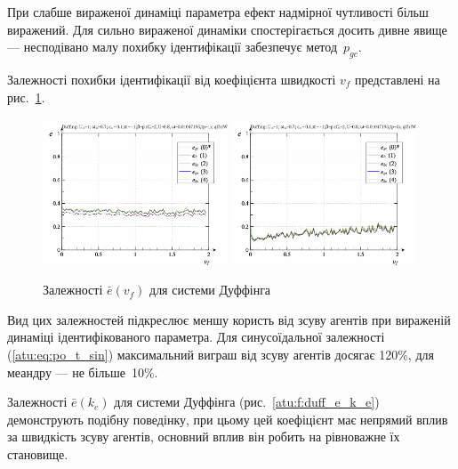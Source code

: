 При слабше вираженої динаміці параметра ефект надмірної
чутливості більш виражений. Для сильно вираженої динаміки
спостерігається досить дивне явище --- несподівано малу похибку
ідентифікації забезпечує метод~$p_{gc}$.

Залежності похибки ідентифікації від коефіцієнта швидкості $ v_f $ представлені на рис.~\ref{atu:f:duff_e_v_f}.

\begin{figure}[ht!]
\begin{center}
  \includegraphics[width=0.49\textwidth]{p/cha/duff/duff_id-p_v_f_sign.png}
  \hfill
  \includegraphics[width=0.49\textwidth]{p/cha/duff/duff_id-p_v_f_sin.png}
\end{center}
\caption{Залежності $ \bar{e} (v_f) $ для системи Дуффінга}
\label{atu:f:duff_e_v_f}
\end{figure}

Вид цих залежностей підкреслює меншу користь від зсуву агентів
при вираженій динаміці ідентифікованого параметра. Для
синусоїдальної залежності (\ref{atu:eq:po_t_sin}) максимальний виграш
від зсуву агентів досягає 120\%, для меандру --- не більше~10\%.

Залежності
$ \bar{e} (k_e) $ для системи Дуффінга (рис.~\ref{atu:f:duff_e_k_e}) демонструють
подібну поведінку, при цьому цей коефіцієнт має непрямий
вплив за швидкість зсуву агентів, основний вплив він робить на
рівноважне їх становище.

